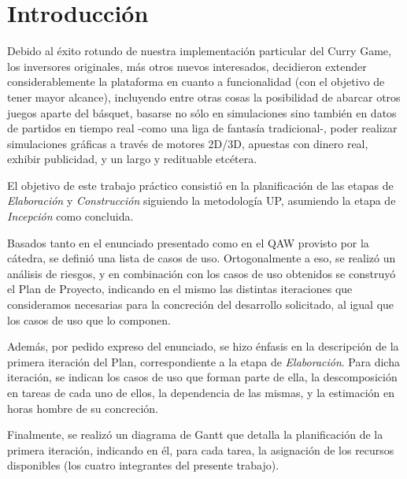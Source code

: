 \section{Introducción}
Debido al éxito rotundo de nuestra implementación particular del Curry Game, los inversores originales, más otros nuevos interesados, decidieron extender considerablemente la plataforma en cuanto a funcionalidad (con el objetivo de tener mayor alcance), incluyendo entre otras cosas la posibilidad de abarcar otros juegos aparte del básquet, basarse no sólo en simulaciones sino también en datos de partidos en tiempo real -como una liga de fantasía tradicional-, poder realizar simulaciones gráficas a través de motores 2D/3D, apuestas con dinero real, exhibir publicidad, y un largo y redituable etcétera.

El objetivo de este trabajo práctico consistió en la planificación de las etapas de \emph{Elaboración} y \emph{Construcción} siguiendo la metodología UP, asumiendo la etapa de \emph{Incepción} como concluida. 

Basados tanto en el enunciado presentado como en el QAW provisto por la cátedra, se definió una lista de casos de uso. Ortogonalmente a eso, se realizó un análisis de riesgos, y en combinación con los casos de uso obtenidos se construyó el Plan de Proyecto, indicando en el mismo las distintas iteraciones que consideramos necesarias para la concreción del desarrollo solicitado, al igual que los casos de uso que lo componen.

Además, por pedido expreso del enunciado, se hizo énfasis en la descripción de la primera iteración del Plan, correspondiente a la etapa de \emph{Elaboración}. Para dicha iteración, se indican los casos de uso que forman parte de ella, la descomposición en tareas de cada uno de ellos, la dependencia de las mismas, y la estimación en horas hombre de su concreción.

Finalmente, se realizó un diagrama de Gantt que detalla la planificación de la primera iteración, indicando en él, para cada tarea, la asignación de los recursos disponibles (los cuatro integrantes del presente trabajo).
